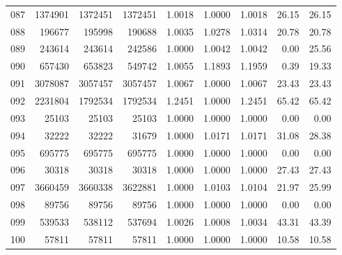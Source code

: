 \begin{longtable}{crrrrrrrr}
087 & 1374901 & 1372451 & 1372451 & 1.0018 & 1.0000 & 1.0018 & 26.15 & 26.15 \\
088 & 196677 & 195998 & 190688 & 1.0035 & 1.0278 & 1.0314 & 20.78 & 20.78 \\
089 & 243614 & 243614 & 242586 & 1.0000 & 1.0042 & 1.0042 & 0.00 & 25.56 \\
090 & 657430 & 653823 & 549742 & 1.0055 & 1.1893 & 1.1959 & 0.39 & 19.33 \\
091 & 3078087 & 3057457 & 3057457 & 1.0067 & 1.0000 & 1.0067 & 23.43 & 23.43 \\
092 & 2231804 & 1792534 & 1792534 & 1.2451 & 1.0000 & 1.2451 & 65.42 & 65.42 \\
093 & 25103 & 25103 & 25103 & 1.0000 & 1.0000 & 1.0000 & 0.00 & 0.00 \\
094 & 32222 & 32222 & 31679 & 1.0000 & 1.0171 & 1.0171 & 31.08 & 28.38 \\
095 & 695775 & 695775 & 695775 & 1.0000 & 1.0000 & 1.0000 & 0.00 & 0.00 \\
096 & 30318 & 30318 & 30318 & 1.0000 & 1.0000 & 1.0000 & 27.43 & 27.43 \\
097 & 3660459 & 3660338 & 3622881 & 1.0000 & 1.0103 & 1.0104 & 21.97 & 25.99 \\
098 & 89756 & 89756 & 89756 & 1.0000 & 1.0000 & 1.0000 & 0.00 & 0.00 \\
099 & 539533 & 538112 & 537694 & 1.0026 & 1.0008 & 1.0034 & 43.31 & 43.39 \\
100 & 57811 & 57811 & 57811 & 1.0000 & 1.0000 & 1.0000 & 10.58 & 10.58 \\
\end{longtable}

